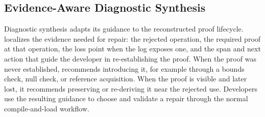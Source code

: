 \subsection{Evidence-Aware Diagnostic Synthesis}
\label{sec:design-synthesis}

Diagnostic synthesis adapts its guidance to the reconstructed proof lifecycle.
\sys localizes the evidence needed for repair: the rejected operation, the required proof at that operation, the loss point when the log exposes one, and the span and next action that guide the developer in re-establishing the proof.
When the proof was never established, \sys recommends introducing it, for example through a bounds check, null check, or reference acquisition.
When the proof is visible and later lost, it recommends preserving or re-deriving it near the rejected use.
Developers use the resulting guidance to choose and validate a repair through the normal compile-and-load workflow.
